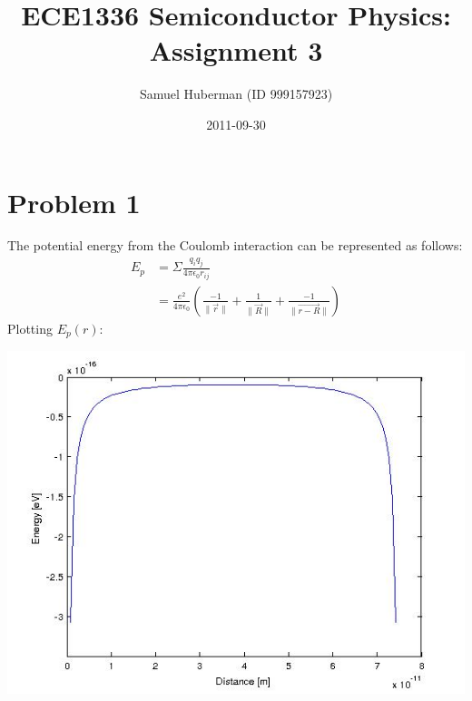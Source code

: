\documentclass{article}
\numberwithin{equation}{section}
\begin{document}
\title{ECE1336 Semiconductor Physics: Assignment 3}
\author{Samuel Huberman (ID 999157923)}
\date{2011-09-30}
\maketitle

\section*{Problem 1}

The potential energy from the Coulomb interaction can be represented as follows:
\begin{align*}
	E_p&=\Sigma \frac{q_iq_j}{4\pi\epsilon_0 r_{ij}}
\\	   &=\frac{e^2}{4\pi\epsilon_0}(\frac{-1}{\parallel \vec{r} \parallel}+\frac{1}{\parallel\vec{R} \parallel}+\frac{-1}{\parallel \vec{r-R} \parallel})
\end{align*}
Plotting $E_p(r)$:


\includegraphics[scale=0.5]{A3q1.jpg}
\end{document}
